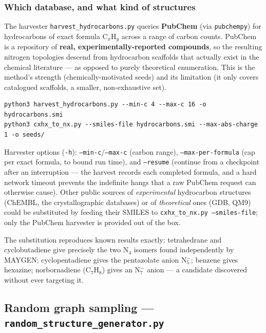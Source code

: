 \documentclass[11pt,a4paper]{article}
\begin{document}
\subsubsection{Which database, and what kind of structures}

The harvester \texttt{harvest\_hydrocarbons.py} queries \textbf{PubChem} (via
\texttt{pubchempy}) for hydrocarbons of exact formula C$_x$H$_y$ across a
range of carbon counts. PubChem is a repository of \textbf{real,
experimentally-reported compounds}, so the resulting nitrogen topologies
descend from hydrocarbon scaffolds that actually exist in the chemical
literature --- as opposed to purely theoretical enumeration. This is the
method's strength (chemically-motivated seeds) and its limitation (it only
covers catalogued scaffolds, a smaller, non-exhaustive set).

\begin{lstlisting}
python3 harvest_hydrocarbons.py --min-c 4 --max-c 16 -o hydrocarbons.smi
python3 cxhx_to_nx.py --smiles-file hydrocarbons.smi --max-abs-charge 1 -o seeds/
\end{lstlisting}

Harvester options (\texttt{-h}): \texttt{--min-c}/\texttt{--max-c} (carbon
range), \texttt{--max-per-formula} (cap per exact formula, to bound run
time), and \texttt{--resume} (continue from a checkpoint after an
interruption --- the harvest records each completed formula, and a hard
network timeout prevents the indefinite hangs that a raw PubChem request can
otherwise cause). Other public sources of \emph{experimental} hydrocarbon
structures (ChEMBL, the crystallographic databases) or of \emph{theoretical}
ones (GDB, QM9) could be substituted by feeding their SMILES to
\texttt{cxhx\_to\_nx.py --smiles-file}; only the PubChem harvester is
provided out of the box.

\begin{finding}[Validation]
The substitution reproduces known results exactly: tetrahedrane and
cyclobutadiene give precisely the two N$_4$ isomers found independently by
MAYGEN; cyclopentadiene gives the pentazolate anion N$_5^{-}$; benzene gives
hexazine; norbornadiene (C$_7$H$_8$) gives an N$_7^{-}$ anion --- a candidate
discovered without ever targeting it.
\end{finding}

\subsection{Random graph sampling --- \texttt{random\_structure\_generator.py}}
\label{sec:random}
\end{document}
